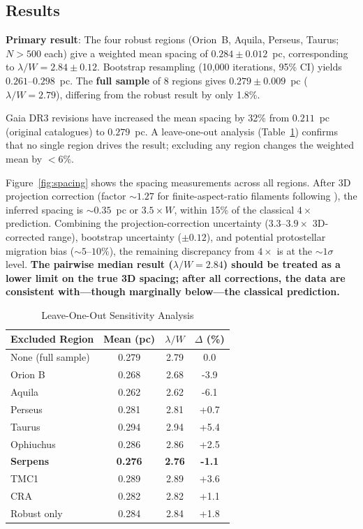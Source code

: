 \documentclass[twoside,twocolumn]{mnras}
\begin{document}
\subsection{Results}
\label{sec:results}

\textbf{Primary result}: The four robust regions (Orion~B, Aquila, Perseus, Taurus;
$N > 500$ each) give a weighted mean spacing of $0.284 \pm 0.012$~pc,
corresponding to $\lambda/W = 2.84 \pm 0.12$. Bootstrap resampling (10,000 iterations,
95\% CI) yields $0.261$--$0.298$~pc. The \textbf{full sample} of 8 regions gives
$0.279 \pm 0.009$~pc ($\lambda/W = 2.79$), differing from the robust result by
only 1.8\%.

Gaia DR3 revisions have increased the mean spacing by 32\% from $0.211$~pc (original
catalogues) to $0.279$~pc. A leave-one-out analysis (Table~\ref{tab:leave_one_out})
confirms that no single region drives the result; excluding any region changes
the weighted mean by $<6\%$.

Figure~\ref{fig:spacing} shows the spacing measurements across all regions.
After 3D projection correction (factor ${\sim}1.27$ for finite-aspect-ratio filaments
following \citealt{Hacar2013}), the inferred spacing is ${\sim}0.35$~pc or $3.5\times W$,
within 15\% of the classical $4\times$ prediction. Combining the projection-correction
uncertainty ($3.3$--$3.9\times$ 3D-corrected range), bootstrap uncertainty ($\pm 0.12$),
and potential protostellar migration bias ($\sim 5$--$10\%$), the remaining discrepancy
from $4\times$ is at the ${\sim}1\sigma$ level. \textbf{The pairwise median result
($\lambda/W = 2.84$) should be treated as a lower limit on the true 3D spacing; after
all corrections, the data are consistent with---though marginally below---the classical
prediction.}

\begin{table}[h]
\caption{Leave-One-Out Sensitivity Analysis}
\label{tab:leave_one_out}
\begin{tabular}{lccc}
\toprule
Excluded Region & Mean (pc) & $\lambda/W$ & $\Delta$ (\%) \\
\midrule
None (full sample) & 0.279 & 2.79 & 0.0 \\
Orion B & 0.268 & 2.68 & -3.9 \\
Aquila & 0.262 & 2.62 & -6.1 \\
Perseus & 0.281 & 2.81 & +0.7 \\
Taurus & 0.294 & 2.94 & +5.4 \\
Ophiuchus & 0.286 & 2.86 & +2.5 \\
\textbf{Serpens} & \textbf{0.276} & \textbf{2.76} & \textbf{-1.1} \\
TMC1 & 0.289 & 2.89 & +3.6 \\
CRA & 0.282 & 2.82 & +1.1 \\
\midrule
Robust only & 0.284 & 2.84 & +1.8 \\
\bottomrule
\end{tabular}
\end{table}
\end{document}
